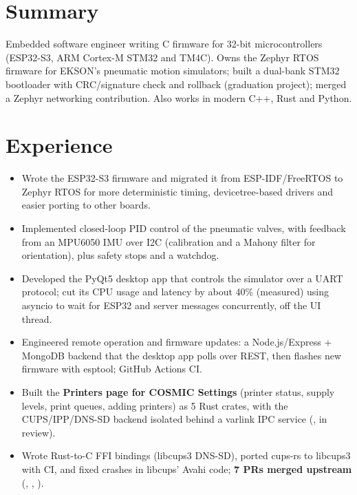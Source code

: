 \documentclass[10pt]{article}
\begin{document}

\section*{Summary}
Embedded software engineer writing C firmware for 32-bit microcontrollers (ESP32-S3, ARM Cortex-M STM32 and TM4C). Owns the Zephyr RTOS firmware for EKSON's pneumatic motion simulators; built a dual-bank STM32 bootloader with CRC/signature check and rollback (graduation project); merged a Zephyr networking contribution. Also works in modern C++, Rust and Python.

\section*{Experience}
\begin{itemize}
  \item Wrote the ESP32-S3 firmware and migrated it from ESP-IDF/FreeRTOS to Zephyr RTOS for more deterministic timing, devicetree-based drivers and easier porting to other boards.
  \item Implemented closed-loop PID control of the pneumatic valves, with feedback from an MPU6050 IMU over I2C (calibration and a Mahony filter for orientation), plus safety stops and a watchdog.
  \item Developed the PyQt5 desktop app that controls the simulator over a UART protocol; cut its CPU usage and latency by about 40\% (measured) using asyncio to wait for ESP32 and server messages concurrently, off the UI thread.
  \item Engineered remote operation and firmware updates: a Node.js/Express + MongoDB backend that the desktop app polls over REST, then flashes new firmware with esptool; GitHub Actions CI.
\end{itemize}
\begin{itemize}
  \item Built the \textbf{Printers page for COSMIC Settings} (printer status, supply levels, print queues, adding printers) as 5 Rust crates, with the CUPS/IPP/DNS-SD backend isolated behind a varlink IPC service (, in review).
  \item Wrote Rust-to-C FFI bindings (libcups3 DNS-SD), ported cups-rs to libcups3 with CI, and fixed crashes in libcups' Avahi code; \textbf{7 PRs merged upstream} (, , ).
\end{itemize}
\end{document}
